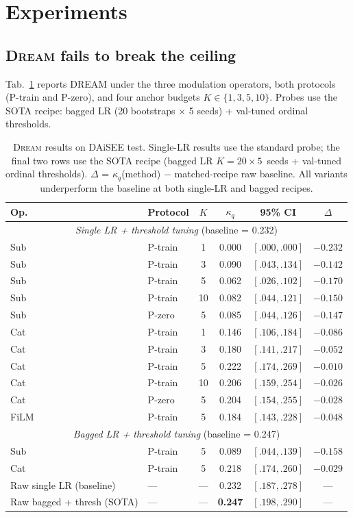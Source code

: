 \section{Experiments}
\label{sec:results}

\subsection{\textsc{Dream} fails to break the ceiling}
\label{sec:dream-results}

Tab.~\ref{tab:dream} reports DREAM under the three modulation
operators, both protocols (P-train and P-zero), and four anchor
budgets $K \in \{1, 3, 5, 10\}$. Probes use the SOTA recipe: bagged
LR (20 bootstraps $\times$ 5 seeds) + val-tuned ordinal thresholds.

\begin{table}[t]
\caption{\textsc{Dream} results on DAiSEE test. Single-LR results
use the standard probe; the final two rows use the SOTA recipe
(bagged LR $K{=}20{\times}5$~seeds + val-tuned ordinal thresholds).
$\Delta$ = $\kappa_q$(method) $-$ matched-recipe raw baseline. All
variants underperform the baseline at both single-LR and bagged
recipes.}
\label{tab:dream}
\centering
\small
\begin{tabular}{llcccc}
\toprule
Op. & Protocol & $K$ & $\kappa_q$ & 95\% CI & $\Delta$\\
\midrule
\multicolumn{6}{c}{\emph{Single LR + threshold tuning} (baseline = 0.232)}\\
Sub & P-train & 1 & 0.000 & $[.000, .000]$ & $-0.232$\\
Sub & P-train & 3 & 0.090 & $[.043, .134]$ & $-0.142$\\
Sub & P-train & 5 & 0.062 & $[.026, .102]$ & $-0.170$\\
Sub & P-train & 10 & 0.082 & $[.044, .121]$ & $-0.150$\\
Sub & P-zero & 5 & 0.085 & $[.044, .126]$ & $-0.147$\\
Cat & P-train & 1 & 0.146 & $[.106, .184]$ & $-0.086$\\
Cat & P-train & 3 & 0.180 & $[.141, .217]$ & $-0.052$\\
Cat & P-train & 5 & 0.222 & $[.174, .269]$ & $-0.010$\\
Cat & P-train & 10 & 0.206 & $[.159, .254]$ & $-0.026$\\
Cat & P-zero & 5 & 0.204 & $[.154, .255]$ & $-0.028$\\
FiLM & P-train & 5 & 0.184 & $[.143, .228]$ & $-0.048$\\
\midrule
\multicolumn{6}{c}{\emph{Bagged LR + threshold tuning} (baseline = 0.247)}\\
Sub & P-train & 5 & 0.089 & $[.044, .139]$ & $-0.158$\\
Cat & P-train & 5 & 0.218 & $[.174, .260]$ & $-0.029$\\
\midrule
Raw single LR (baseline) & --- & --- & 0.232 & $[.187, .278]$ & ---\\
Raw bagged + thresh (SOTA) & --- & --- & \textbf{0.247} & $[.198, .290]$ & ---\\
\bottomrule
\end{tabular}
\end{table}

